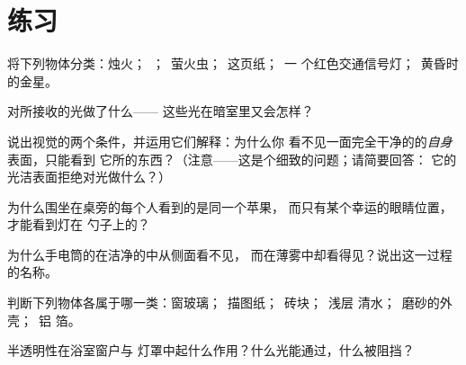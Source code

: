 \section{练习}

\begin{exercise}[$\star$]\label{exo:g7:light-sources-propagation:1}
将下列物体分类：烛火；\ ；\ 萤火虫；\ 这页纸；\ 一
个红色交通信号灯；\ 黄昏时的金星。
\end{exercise}

\begin{exercise}[$\star$]\label{exo:g7:light-sources-propagation:2}
对所接收的光做了什么——
这些光在暗室里又会怎样？
\end{exercise}

\begin{exercise}[$\star$]\label{exo:g7:light-sources-propagation:3}
说出视觉的两个条件，并运用它们解释：为什么你
看不见一面完全干净的的\emph{自身}表面，只能看到
它所的东西？（注意——这是个细致的问题；请简要回答：
它的光洁表面拒绝对光做什么？）
\end{exercise}

\begin{exercise}[$\star$]\label{exo:g7:light-sources-propagation:4}
为什么围坐在桌旁的每个人看到的是同一个苹果，
而只有某个幸运的眼睛位置，才能看到灯在
勺子上的？
\end{exercise}

\begin{exercise}[$\star$]\label{exo:g7:light-sources-propagation:5}
为什么手电筒的在洁净的中从侧面看不见，
而在薄雾中却看得见？说出这一过程的名称。
\end{exercise}

\begin{exercise}[$\star$]\label{exo:g7:light-sources-propagation:6}
判断下列物体各属于哪一类：窗玻璃；\ 描图纸；\ 砖块；\ 浅层
清水；\ 磨砂的外壳；\ 铝
箔。
\end{exercise}

\begin{exercise}[$\star$]\label{exo:g7:light-sources-propagation:7}
半透明性在浴室窗户与
灯罩中起什么作用？什么光能通过，什么被阻挡？
\end{exercise}

